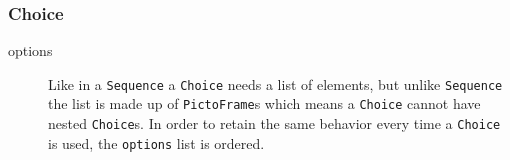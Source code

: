 \subsubsection{Choice}
\begin{description}
	\item[options] Like in a \texttt{Sequence} a \texttt{Choice} needs a list of elements, but unlike \texttt{Sequence} the list is made up of \texttt{PictoFrame}s which means a \texttt{Choice} cannot have nested \texttt{Choice}s.
    In order to retain the same behavior every time a \texttt{Choice} is used, the \texttt{options} list is ordered.
\end{description}
